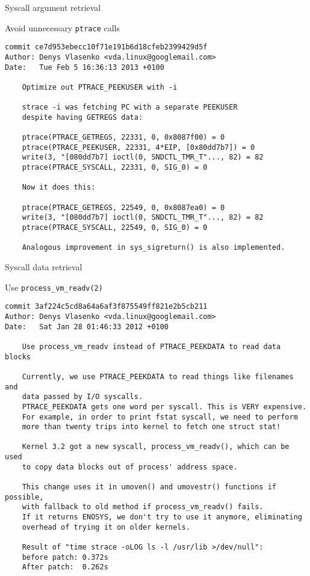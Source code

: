 \documentclass[unicode]{beamer}
\begin{document}
\begin{frame}[fragile]{Syscall argument retrieval}
\begin{block}{\large Avoid unnecessary \texttt{ptrace} calls}
\begin{scriptsize}
\begin{verbatim}
commit ce7d953ebecc10f71e191b6d18cfeb2399429d5f
Author: Denys Vlasenko <vda.linux@googlemail.com>
Date:   Tue Feb 5 16:36:13 2013 +0100

    Optimize out PTRACE_PEEKUSER with -i
    
    strace -i was fetching PC with a separate PEEKUSER
    despite having GETREGS data:
    
    ptrace(PTRACE_GETREGS, 22331, 0, 0x8087f00) = 0
    ptrace(PTRACE_PEEKUSER, 22331, 4*EIP, [0x80dd7b7]) = 0
    write(3, "[080dd7b7] ioctl(0, SNDCTL_TMR_T"..., 82) = 82
    ptrace(PTRACE_SYSCALL, 22331, 0, SIG_0) = 0
    
    Now it does this:
    
    ptrace(PTRACE_GETREGS, 22549, 0, 0x8087ea0) = 0
    write(3, "[080dd7b7] ioctl(0, SNDCTL_TMR_T"..., 82) = 82
    ptrace(PTRACE_SYSCALL, 22549, 0, SIG_0) = 0
    
    Analogous improvement in sys_sigreturn() is also implemented.
\end{verbatim}
\end{scriptsize}
\end{block}
\end{frame}

\begin{frame}[fragile]{Syscall data retrieval}
\begin{block}{\large Use \texttt{process\_vm\_readv(2)}}
\begin{scriptsize}
\begin{verbatim}
commit 3af224c5cd8a64a6af3f875549ff821e2b5cb211
Author: Denys Vlasenko <vda.linux@googlemail.com>
Date:   Sat Jan 28 01:46:33 2012 +0100

    Use process_vm_readv instead of PTRACE_PEEKDATA to read data blocks
    
    Currently, we use PTRACE_PEEKDATA to read things like filenames and
    data passed by I/O syscalls.
    PTRACE_PEEKDATA gets one word per syscall. This is VERY expensive.
    For example, in order to print fstat syscall, we need to perform
    more than twenty trips into kernel to fetch one struct stat!
    
    Kernel 3.2 got a new syscall, process_vm_readv(), which can be used
    to copy data blocks out of process' address space.
    
    This change uses it in umoven() and umovestr() functions if possible,
    with fallback to old method if process_vm_readv() fails.
    If it returns ENOSYS, we don't try to use it anymore, eliminating
    overhead of trying it on older kernels.
    
    Result of "time strace -oLOG ls -l /usr/lib >/dev/null":
    before patch: 0.372s
    After patch:  0.262s
\end{verbatim}
\end{scriptsize}
\end{block}
\end{frame}
\end{document}
